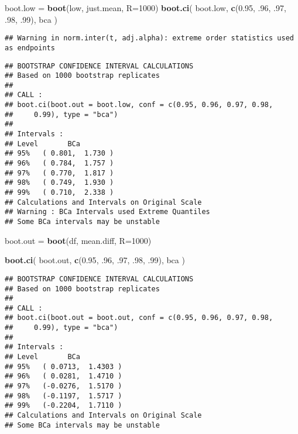\documentclass[
]{article}
\newenvironment{Shaded}{\begin{snugshade}}{\end{snugshade}}
\newcommand{\AttributeTok}[1]{\textcolor[rgb]{0.13,0.29,0.53}{#1}}
\newcommand{\DecValTok}[1]{\textcolor[rgb]{0.00,0.00,0.81}{#1}}
\newcommand{\FloatTok}[1]{\textcolor[rgb]{0.00,0.00,0.81}{#1}}
\newcommand{\FunctionTok}[1]{\textcolor[rgb]{0.13,0.29,0.53}{\textbf{#1}}}
\newcommand{\NormalTok}[1]{#1}
\newcommand{\OtherTok}[1]{\textcolor[rgb]{0.56,0.35,0.01}{#1}}
\newcommand{\StringTok}[1]{\textcolor[rgb]{0.31,0.60,0.02}{#1}}
\begin{document}
\begin{Shaded}
\begin{Highlighting}[]
\NormalTok{boot.low }\OtherTok{=} \FunctionTok{boot}\NormalTok{(low, just.mean, }\AttributeTok{R=}\DecValTok{1000}\NormalTok{)}
\FunctionTok{boot.ci}\NormalTok{(}
\NormalTok{    boot.low,}
    \FunctionTok{c}\NormalTok{(}\FloatTok{0.95}\NormalTok{, .}\DecValTok{96}\NormalTok{, .}\DecValTok{97}\NormalTok{, .}\DecValTok{98}\NormalTok{, .}\DecValTok{99}\NormalTok{),}
    \StringTok{\textquotesingle{}bca\textquotesingle{}}
\NormalTok{)}
\end{Highlighting}
\end{Shaded}

\begin{verbatim}
## Warning in norm.inter(t, adj.alpha): extreme order statistics used as endpoints
\end{verbatim}

\begin{verbatim}
## BOOTSTRAP CONFIDENCE INTERVAL CALCULATIONS
## Based on 1000 bootstrap replicates
## 
## CALL : 
## boot.ci(boot.out = boot.low, conf = c(0.95, 0.96, 0.97, 0.98, 
##     0.99), type = "bca")
## 
## Intervals : 
## Level       BCa          
## 95%   ( 0.801,  1.730 )   
## 96%   ( 0.784,  1.757 )   
## 97%   ( 0.770,  1.817 )   
## 98%   ( 0.749,  1.930 )   
## 99%   ( 0.710,  2.338 )  
## Calculations and Intervals on Original Scale
## Warning : BCa Intervals used Extreme Quantiles
## Some BCa intervals may be unstable
\end{verbatim}

\begin{Shaded}
\begin{Highlighting}[]
\NormalTok{boot.out }\OtherTok{=} \FunctionTok{boot}\NormalTok{(df, mean.diff, }\AttributeTok{R=}\DecValTok{1000}\NormalTok{)}

\FunctionTok{boot.ci}\NormalTok{(}
\NormalTok{    boot.out,}
    \FunctionTok{c}\NormalTok{(}\FloatTok{0.95}\NormalTok{, .}\DecValTok{96}\NormalTok{, .}\DecValTok{97}\NormalTok{, .}\DecValTok{98}\NormalTok{, .}\DecValTok{99}\NormalTok{),}
    \StringTok{\textquotesingle{}bca\textquotesingle{}}
\NormalTok{)}
\end{Highlighting}
\end{Shaded}

\begin{verbatim}
## BOOTSTRAP CONFIDENCE INTERVAL CALCULATIONS
## Based on 1000 bootstrap replicates
## 
## CALL : 
## boot.ci(boot.out = boot.out, conf = c(0.95, 0.96, 0.97, 0.98, 
##     0.99), type = "bca")
## 
## Intervals : 
## Level       BCa          
## 95%   ( 0.0713,  1.4303 )   
## 96%   ( 0.0281,  1.4710 )   
## 97%   (-0.0276,  1.5170 )   
## 98%   (-0.1197,  1.5717 )   
## 99%   (-0.2204,  1.7110 )  
## Calculations and Intervals on Original Scale
## Some BCa intervals may be unstable
\end{verbatim}
\end{document}
